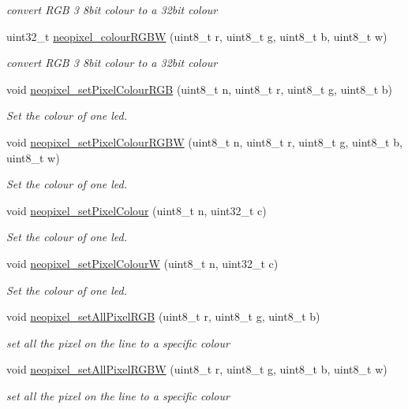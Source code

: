 \begin{DoxyCompactItemize}
\begin{DoxyCompactList}\small\item\em convert R\+GB 3 8bit colour to a 32bit colour \end{DoxyCompactList}\item 
uint32\+\_\+t \hyperlink{group___neo_pixel_ga527ba03b45a249e5e1ea1da4b971b3ac}{neopixel\+\_\+colour\+R\+G\+BW} (uint8\+\_\+t r, uint8\+\_\+t g, uint8\+\_\+t b, uint8\+\_\+t w)
\begin{DoxyCompactList}\small\item\em convert R\+GB 3 8bit colour to a 32bit colour \end{DoxyCompactList}\item 
void \hyperlink{group___neo_pixel_ga63c196a71ffb007411929e41ba5df41d}{neopixel\+\_\+set\+Pixel\+Colour\+R\+GB} (uint8\+\_\+t n, uint8\+\_\+t r, uint8\+\_\+t g, uint8\+\_\+t b)
\begin{DoxyCompactList}\small\item\em Set the colour of one led. \end{DoxyCompactList}\item 
void \hyperlink{group___neo_pixel_ga58d5ceb79029ca8dc5dd8b27b65e4f09}{neopixel\+\_\+set\+Pixel\+Colour\+R\+G\+BW} (uint8\+\_\+t n, uint8\+\_\+t r, uint8\+\_\+t g, uint8\+\_\+t b, uint8\+\_\+t w)
\begin{DoxyCompactList}\small\item\em Set the colour of one led. \end{DoxyCompactList}\item 
void \hyperlink{group___neo_pixel_gaecbdecac1da356c5fba07058983d9066}{neopixel\+\_\+set\+Pixel\+Colour} (uint8\+\_\+t n, uint32\+\_\+t c)
\begin{DoxyCompactList}\small\item\em Set the colour of one led. \end{DoxyCompactList}\item 
void \hyperlink{group___neo_pixel_ga4daf6edfe83394f425ec51f64d92c49c}{neopixel\+\_\+set\+Pixel\+ColourW} (uint8\+\_\+t n, uint32\+\_\+t c)
\begin{DoxyCompactList}\small\item\em Set the colour of one led. \end{DoxyCompactList}\item 
void \hyperlink{group___neo_pixel_ga7a6c2dc149e86a788aede1d6aa5262d7}{neopixel\+\_\+set\+All\+Pixel\+R\+GB} (uint8\+\_\+t r, uint8\+\_\+t g, uint8\+\_\+t b)
\begin{DoxyCompactList}\small\item\em set all the pixel on the line to a specific colour \end{DoxyCompactList}\item 
void \hyperlink{group___neo_pixel_ga1ba017c1f338ef2c8e4a48acae35d87e}{neopixel\+\_\+set\+All\+Pixel\+R\+G\+BW} (uint8\+\_\+t r, uint8\+\_\+t g, uint8\+\_\+t b, uint8\+\_\+t w)
\begin{DoxyCompactList}\small\item\em set all the pixel on the line to a specific colour \end{DoxyCompactList}\end{DoxyCompactItemize}


